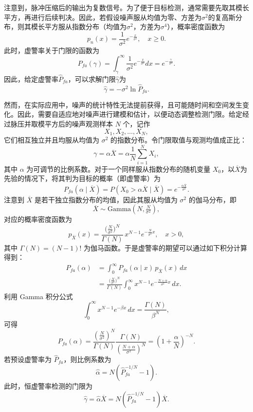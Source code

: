注意到，脉冲压缩后的输出为复数信号。为了便于目标检测，通常需要先取其模长平方，再进行后续判决。因此，若假设噪声服从均值为零、方差为\( \sigma^2 \)的复高斯分布，则其模长平方服从指数分布（均值为\( \sigma^2 \)，方差为\( \sigma^4 \)），概率密度函数为
\[
    p_n(x) = \frac{1}{\sigma^2} e^{-\frac{x}{\sigma^2}}, \quad x \geq 0.
\]
此时，虚警率关于门限的函数为
\[
    P_{fa}(\gamma) = \int_{\gamma}^{\infty} \frac{1}{\sigma^2} e^{-\frac{x}{\sigma^2}} dx = e^{-\frac{\gamma}{\sigma^2}}.
\]
因此，给定虚警率\( \hat{P}_{fa} \)，可以求解门限\( \hat{\gamma} \)为
\[
    \hat{\gamma} = -\sigma^2 \ln \hat{P}_{fa}.
\]

然而，在实际应用中，噪声的统计特性无法提前获得，且可能随时间和空间发生变化。因此，需要自适应地对噪声进行建模和估计，以便动态调整检测门限。给定经过脉压并取模平方后的噪声观测样本 \( N \) 个，记作
\[
    X_1, X_2, \ldots, X_N,
\]
它们相互独立并且均服从均值为 \( \sigma^2 \) 的指数分布。令门限取值与观测均值成正比：
\[
    \gamma = \alpha \overline{X} = \alpha \frac{1}{N}\sum_{i=1}^{N} X_i,
\]
其中 \( \alpha \) 为可调节的比例系数。对于一个同样服从指数分布的随机变量 \( X_0 \)，以\( \overline{X} \)为先验的情况下，将其判为目标的概率（即虚警率）为
\[
    P_{fa}(\alpha \mid \overline{X}) = P(X_0 > \alpha \overline{X} \mid \overline{X})
    = e^{-\tfrac{\alpha \overline{X}}{\sigma^2}}.
\]
注意到 \( \overline{X} \) 是若干独立指数分布的均值，因此其服从均值为 \( \sigma^2 \) 的伽马分布，即
\[
    \overline{X} \sim \mathrm{Gamma}\!\left(N, \tfrac{N}{\sigma^2}\right),
\]
对应的概率密度函数为
\[
    p_{\overline{X}}(x) = \frac{\bigl(\tfrac{N}{\sigma^2}\bigr)^N}{\Gamma(N)}\,x^{N-1}
    e^{-\tfrac{N}{\sigma^2}x}, \quad x>0,
\]
其中 \( \Gamma(N)=(N-1)! \) 为伽马函数。于是虚警率的期望可以通过如下积分计算得到：
\[
    \begin{aligned}
        P_{fa}(\alpha)
         & = \int_{0}^{\infty} P_{fa}(\alpha \mid x)\,p_{\overline{X}}(x)\,dx \\
         & = \frac{\bigl(\tfrac{N}{\sigma^2}\bigr)^N}{\Gamma(N)}
        \int_{0}^{\infty} x^{N-1} e^{-\tfrac{N+\alpha}{\sigma^2}x}\,dx.
    \end{aligned}
\]
利用 Gamma 积分公式
\[
    \int_{0}^{\infty} x^{N-1} e^{-\beta x}\,dx = \frac{\Gamma(N)}{\beta^N},
\]
可得
\[
    P_{fa}(\alpha) = \frac{\left(\frac{N}{\sigma^2}\right)^{N}}{\Gamma(N)} \frac{\Gamma(N)}{\left(\frac{N+\alpha}{\sigma^2}\right)^{N}} = \left(1+\frac{\alpha}{N}\right)^{-N}.
\]
若预设虚警率为 \( \hat{P}_{fa} \)，则比例系数为
\[
    \hat{\alpha} = N\left(\hat{P}_{fa}^{-1/N}-1\right).
\]
此时，恒虚警率检测的门限为
\[
    \hat{\gamma} = \hat{\alpha} \overline{X}
    = N\left(\hat{P}_{fa}^{-1/N}-1\right)\overline{X}.
\]

